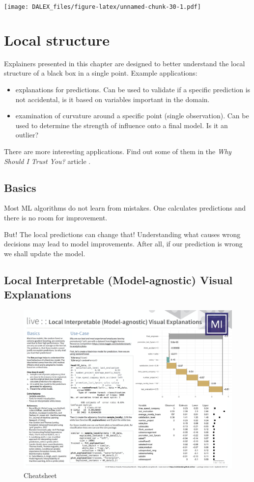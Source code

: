 \documentclass[]{book}
\providecommand{\tightlist}{%
  \setlength{\itemsep}{0pt}\setlength{\parskip}{0pt}}
\theoremstyle{definition}
\theoremstyle{definition}
\theoremstyle{definition}
\theoremstyle{remark}
\begin{document}
\texttt{[image: DALEX\_files/figure-latex/unnamed-chunk-30-1.pdf]}

\chapter{Local structure}\label{local-structure}

Explainers presented in this chapter are designed to better understand
the local structure of a black box in a single point. Example
applications:

\begin{itemize}
\tightlist
\item
  explanations for predictions. Can be used to validate if a specific
  prediction is not accidental, is it based on variables important in
  the domain.
\item
  examination of curvature around a specific point (single observation).
  Can be used to determine the strength of influence onto a final model.
  Is it an outlier?
\end{itemize}

There are more interesting applications. Find out some of them in the
\emph{Why Should I Trust You?} article \citep{lime}.

\section{Basics}\label{basics}

Most ML algorithms do not learn from mistakes. One calculates
predictions and there is no room for improvement.

But! The local predictions can change that! Understanding what causes
wrong decisions may lead to model improvements. After all, if our
prediction is wrong we shall update the model.

\section{Local Interpretable (Model-agnostic) Visual
Explanations}\label{local-interpretable-model-agnostic-visual-explanations}

\begin{figure}
\centering
\includegraphics{images/DALEX_live.png}
\caption{Cheatsheet}
\end{figure}
\end{document}
